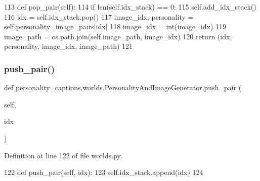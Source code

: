 \begin{DoxyCode}
113     \textcolor{keyword}{def }pop\_pair(self):
114         \textcolor{keywordflow}{if} len(self.idx\_stack) == 0:
115             self.add\_idx\_stack()
116         idx = self.idx\_stack.pop()
117         image\_idx, personality = self.personality\_image\_pairs[idx]
118         image\_idx = \hyperlink{namespacelanguage__model_1_1eval__ppl_a7d12ee00479673c5c8d1f6d01faa272a}{int}(image\_idx)
119         image\_path = os.path.join(self.image\_path, image\_idx)
120         \textcolor{keywordflow}{return} (idx, personality, image\_idx, image\_path)
121 
\end{DoxyCode}
\mbox{\label{classpersonality__captions_1_1worlds_1_1PersonalityAndImageGenerator_a9d4d745f2bc678ff0cae5048f0efc047}} 
\subsubsection{\texorpdfstring{push\+\_\+pair()}{push\_pair()}}
{\footnotesize\ttfamily def personality\+\_\+captions.\+worlds.\+Personality\+And\+Image\+Generator.\+push\+\_\+pair (\begin{DoxyParamCaption}\item[{}]{self,  }\item[{}]{idx }\end{DoxyParamCaption})}



Definition at line 122 of file worlds.\+py.


\begin{DoxyCode}
122     \textcolor{keyword}{def }push\_pair(self, idx):
123         self.idx\_stack.append(idx)
124 
\end{DoxyCode}
\mbox{\label{classpersonality__captions_1_1worlds_1_1PersonalityAndImageGenerator_af76fb5f34ce3555d6e56edf5ad8de390}} 

